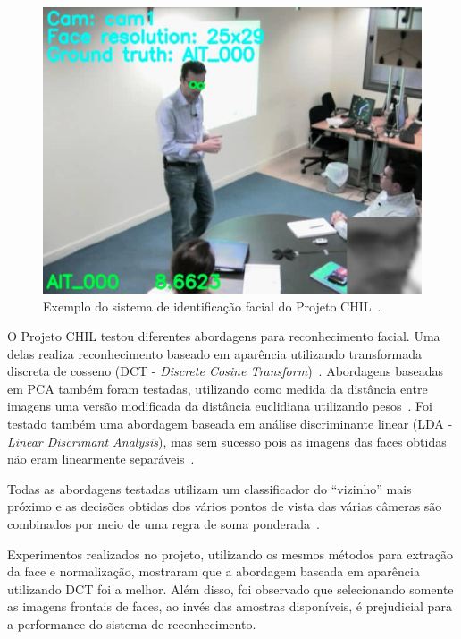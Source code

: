 	\begin{figure}[hbt]
		\begin{center}
			\includegraphics[scale=0.4]{figuras/3.TrabalhosCorrelatos/chil.png}
		\end{center}
		\caption{Exemplo do sistema de identificação facial do Projeto CHIL~\cite{chil}.}
		\label{chil}
	\end{figure}


O Projeto CHIL testou diferentes abordagens para reconhecimento facial. Uma delas realiza reconhecimento baseado em aparência utilizando transformada discreta de cosseno (DCT - \textit{Discrete Cosine Transform})~\cite{chilref6, chilref7}. Abordagens baseadas em PCA também foram testadas, utilizando como medida da distância entre imagens uma versão modificada da distância euclidiana utilizando pesos~\cite{chilref8, chilref9}.  Foi testado também uma abordagem baseada em análise discriminante linear (LDA - \textit{Linear Discrimant Analysis}), mas sem sucesso pois as imagens das faces obtidas não eram linearmente separáveis~\cite{chilref8, chilref9}. 

Todas as abordagens testadas utilizam um classificador do ``vizinho'' mais
próximo e as decisões obtidas dos vários pontos de vista das várias câmeras são
combinados por meio de uma regra de soma ponderada~\cite{chilref8, chilref9}.

Experimentos realizados no projeto, utilizando os mesmos métodos para extração da face e normalização, mostraram que a abordagem baseada em aparência utilizando DCT foi a melhor. Além disso, foi observado que selecionando somente as imagens frontais de faces, ao invés das amostras disponíveis, é prejudicial para a performance do sistema de reconhecimento. 

